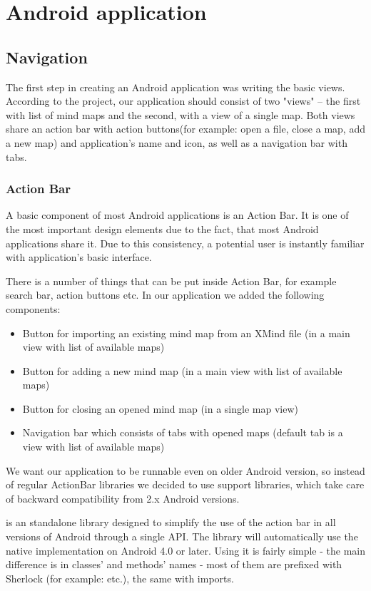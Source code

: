 \section{Android application}
\label{sec:android-app}

\subsection{Navigation}
\label{subsec:drawing}
The first step in creating an Android application was writing the basic views. According to the project, our application should consist of two "views" -- the first with list of mind maps and the second, with a view of a single map. Both views share an action bar with action buttons(for example: open a file, close a map, add a new map) and application's name and icon, as well as a navigation bar with tabs. 

\subsubsection{Action Bar}
\label{subsubsec:action-bar}
A basic component of most Android applications is an Action Bar. It is one of the most important design elements due to the fact, that most Android applications share it. Due to this consistency, a potential user is instantly familiar with application's basic interface. 

There is a number of things that can be put inside Action Bar, for example search bar, action buttons etc. In our application we added the following components:
\begin{itemize}
	\item Button for importing an existing mind map  from an XMind file (in a main view with list of available maps)
	\item Button for adding a new mind map (in a main view with list of available maps)
	\item Button for closing an opened mind map (in a single map view)
	\item Navigation bar which consists of tabs with opened maps (default tab is a view with list of available maps)
\end{itemize}

We want our application to be runnable even on older Android version, so instead of regular ActionBar libraries we decided to use support libraries, which take care of backward compatibility from 2.x Android versions.

 is an standalone library designed to simplify the use of the action bar in all versions of Android through a single API. The library will automatically use the native  implementation on Android 4.0 or later\cite{Wharton:2013:sherlock}. Using it is fairly simple - the main difference is in  classes' and methods' names - most of them are prefixed with Sherlock (for example:  etc.), the same with imports. 

